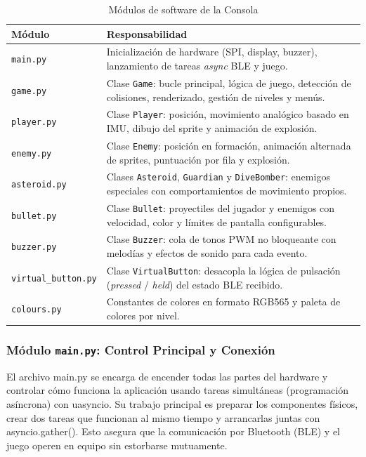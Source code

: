 \begin{table}[H]
    \centering
    \caption{Módulos de software de la Consola}
    \label{tab:modulos_consola}
    \begin{tabular}{|l|p{10cm}|}
        \hline
        \textbf{Módulo} & \textbf{Responsabilidad} \\ \hline
        \texttt{main.py} & Inicialización de hardware (SPI, display, buzzer), lanzamiento de tareas \textit{async} BLE y juego. \\ \hline
        \texttt{game.py} & Clase \texttt{Game}: bucle principal, lógica de juego, detección de colisiones, renderizado, gestión de niveles y menús. \\ \hline
        \texttt{player.py} & Clase \texttt{Player}: posición, movimiento analógico basado en IMU, dibujo del sprite y animación de explosión. \\ \hline
        \texttt{enemy.py} & Clase \texttt{Enemy}: posición en formación, animación alternada de sprites, puntuación por fila y explosión. \\ \hline
        \texttt{asteroid.py} & Clases \texttt{Asteroid}, \texttt{Guardian} y \texttt{DiveBomber}: enemigos especiales con comportamientos de movimiento propios. \\ \hline
        \texttt{bullet.py} & Clase \texttt{Bullet}: proyectiles del jugador y enemigos con velocidad, color y límites de pantalla configurables. \\ \hline
        \texttt{buzzer.py} & Clase \texttt{Buzzer}: cola de tonos PWM no bloqueante con melodías y efectos de sonido para cada evento. \\ \hline
        \texttt{virtual\_button.py} & Clase \texttt{VirtualButton}: desacopla la lógica de pulsación (\textit{pressed} / \textit{held}) del estado BLE recibido. \\ \hline
        \texttt{colours.py} & Constantes de colores en formato RGB565 y paleta de colores por nivel. \\ \hline
    \end{tabular}
\end{table}


\subsubsection{Módulo \texttt{main.py}: Control Principal y Conexión}
El archivo main.py se encarga de encender todas las partes del hardware y controlar cómo funciona la aplicación usando tareas simultáneas (programación asíncrona) con uasyncio. Su trabajo principal es preparar los componentes físicos, crear dos tareas que funcionan al mismo tiempo y arrancarlas juntas con asyncio.gather(). Esto asegura que la comunicación por Bluetooth (BLE) y el juego operen en equipo sin estorbarse mutuamente.

